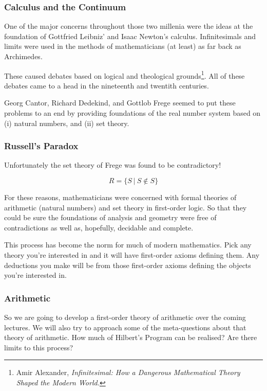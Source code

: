 \documentclass{beamer}
\begin{document}
\begin{frame}
	\frametitle{Calculus and the Continuum}
	
	One of the major concerns throughout those two millenia were the ideas at the foundation of Gottfried Leibniz' and Isaac Newton's calculus. Infinitesimals and limits were used in the methods of mathematicians (at least) as far back as Archimedes. 
	
	\vspace{0.5cm}
	
	These caused debates based on logical and theological grounds\footnote{Amir Alexander, \emph{Infinitesimal: How a Dangerous Mathematical Theory Shaped the Modern World.}}. All of these debates came to a head in the nineteenth and twentith centuries. 
	
	\vspace{0.5cm} 
	
	Georg Cantor, Richard Dedekind, and Gottlob Frege seemed to put these problems to an end by providing foundations of the real number system based on (i) natural numbers, and (ii) set theory. 
	
\end{frame}

\begin{frame}
	\frametitle{Russell's Paradox}
	
	Unfortunately the set theory of Frege was found to be contradictory!
	
	$$R = \{S \ | \ S \notin S \}$$
	
	\vspace{0.5cm}
	
	For these reasons, mathematicians were concerned with formal theories of arithmetic (natural numbers) and set theory in first-order logic. So that they could be sure the foundations of analysis and geometry were free of contradictions as well as, hopefully, decidable and complete. 
	
	\vspace{0.5cm}
	
	This process has become the norm for much of modern mathematics. Pick any theory you're interested in and it will have first-order axioms defining them. Any deductions you make will be from those first-order axioms defining the objects you're interested in. 
\end{frame}

\begin{frame}
	\frametitle{Arithmetic}
	
	So we are going to develop a first-order theory of arithmetic over the coming lectures. We will also try to approach some of the meta-questions about that theory of arithmetic. How much of Hilbert's Program can be realised? Are there limits to this process?
	
\end{frame}
\end{document}
